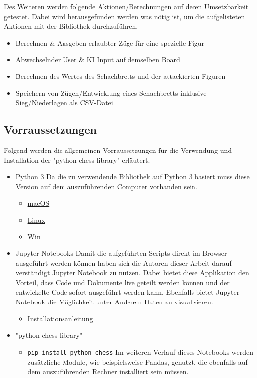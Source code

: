 Des Weiteren werden folgende Aktionen/Berechnungen auf deren
Umsetzbarkeit getestet. Dabei wird herausgefunden werden was nötig ist,
um die aufgelisteten Aktionen mit der Bibliothek durchzuführen.

\begin{itemize}
\tightlist
\item
  Berechnen \& Ausgeben erlaubter Züge für eine spezielle Figur
\item
  Abwechselnder User \& KI Input auf demselben Board
\item
  Berechnen des Wertes des Schachbretts und der attackierten Figuren
\item
  Speichern von Zügen/Entwicklung eines Schachbretts inklusive
  Sieg/Niederlagen als CSV-Datei
\end{itemize}

\subsection{Vorraussetzungen}\label{vorraussetzungen}

Folgend werden die allgemeinen Vorraussetzungen für die Verwendung und
Installation der "python-chess-library" erläutert.

\begin{itemize}
\tightlist
\item
  Python 3 Da die zu verwendende Bibliothek auf Python 3 basiert muss
  diese Version auf dem auszuführenden Computer vorhanden sein.

  \begin{itemize}
  \tightlist
  \item
    \href{https://wsvincent.com/install-python3-mac/}{macOS}
  \item
    \href{https://docs.python-guide.org/starting/install3/linux/}{Linux}
  \item
    \href{https://realpython.com/installing-python/}{Win}
  \end{itemize}
\item
  Jupyter Notebooks Damit die aufgeführten Scripts direkt im Browser
  ausgeführt werden können haben sich die Autoren dieser Arbeit darauf
  verständigt Jupyter Notebook zu nutzen. Dabei bietet diese Applikation
  den Vorteil, dass Code und Dokumente live geteilt werden können und
  der entwickelte Code sofort ausgeführt werden kann. Ebenfalls bietet
  Jupyter Notebook die Möglichkeit unter Anderem Daten zu visualisieren.

  \begin{itemize}
  \tightlist
  \item
    \href{https://jupyter.org/install}{Installationsanleitung}
  \end{itemize}
\item
  "python-chess-library"

  \begin{itemize}
  \tightlist
  \item
    \texttt{pip\ install\ python-chess} Im weiteren Verlauf dieses
    Notebooks werden zusätzliche Module, wie beispielsweise Pandas,
    genutzt, die ebenfalls auf dem auszuführenden Rechner installiert
    sein müssen.
  \end{itemize}
\end{itemize}

